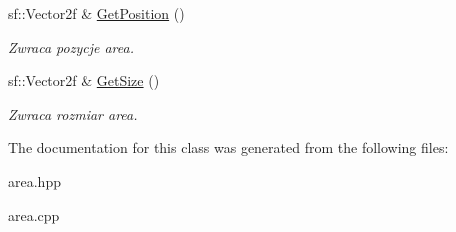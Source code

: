 \begin{DoxyCompactItemize}
\mbox{\label{classtfp_1_1_dragable_area_ab6c1e015b34271a22cef709bb8041218}} 
sf\+::\+Vector2f \& \mbox{\hyperlink{classtfp_1_1_dragable_area_ab6c1e015b34271a22cef709bb8041218}{Get\+Position}} ()
\begin{DoxyCompactList}\small\item\em Zwraca pozycje area. \end{DoxyCompactList}\item 
\mbox{\label{classtfp_1_1_dragable_area_a7f936c9b861f023899adf8bf5b0a8cb8}} 
sf\+::\+Vector2f \& \mbox{\hyperlink{classtfp_1_1_dragable_area_a7f936c9b861f023899adf8bf5b0a8cb8}{Get\+Size}} ()
\begin{DoxyCompactList}\small\item\em Zwraca rozmiar area. \end{DoxyCompactList}\end{DoxyCompactItemize}


The documentation for this class was generated from the following files\+:\begin{DoxyCompactItemize}
\item 
area.\+hpp\item 
area.\+cpp\end{DoxyCompactItemize}
